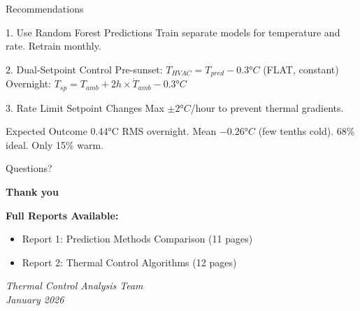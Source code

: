 \documentclass[aspectratio=169,11pt]{beamer}
\begin{document}
\begin{frame}{Recommendations}

\begin{block}{1. Use Random Forest Predictions}
Train separate models for temperature and rate. Retrain monthly.
\end{block}

\begin{block}{2. Dual-Setpoint Control}
Pre-sunset: $T_{HVAC} = T_{pred} - 0.3°C$ (FLAT, constant)\\
Overnight: $T_{sp} = T_{amb} + 2h \times \dot{T}_{amb} - 0.3°C$
\end{block}

\begin{block}{3. Rate Limit Setpoint Changes}
Max $\pm 2°C$/hour to prevent thermal gradients.
\end{block}

\begin{alertblock}{Expected Outcome}
0.44°C RMS overnight. Mean $-0.26°C$ (few tenths cold). 68\% ideal. Only 15\% warm.
\end{alertblock}

\end{frame}

\begin{frame}{Questions?}

\centering
\vspace{2em}

{\Large\textbf{Thank you}}

\vspace{2em}

\textbf{Full Reports Available:}
\begin{itemize}
    \item Report 1: Prediction Methods Comparison (11 pages)
    \item Report 2: Thermal Control Algorithms (12 pages)
\end{itemize}

\vspace{2em}

\textit{Thermal Control Analysis Team}\\
\textit{January 2026}

\end{frame}
\end{document}
